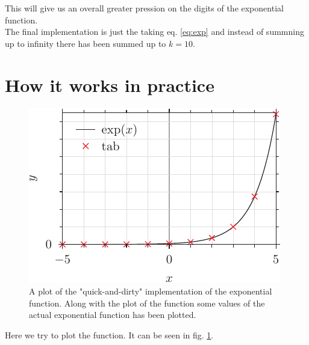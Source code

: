 \documentclass[twocolumn, a4paper]{article}
\begin{document}
This will give us an overall greater pression on the digits of the exponential function. \\

The final implementation is just the taking eq. \ref{eq:exp} and instead of summning up to infinity there has been summed up to $k = 10$.

\section{How it works in practice}

\begin{figure} 
	\includegraphics{exp_pyx.pdf}
	\caption{A plot of the "quick-and-dirty" implementation of the exponential function. Along with the plot of the function some values of the actual exponential function has been plotted.}
	\label{fig:exp_dirty}
\end{figure}

Here we try to plot the function. It can be seen in fig. \ref{fig:exp_dirty}.
\end{document}
